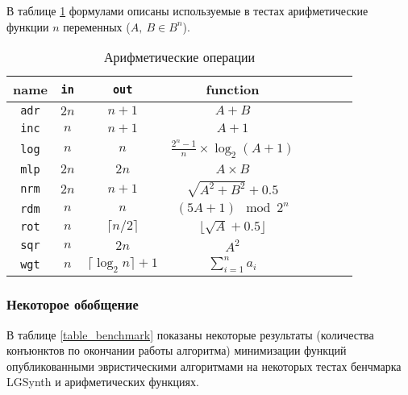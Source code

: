 \documentclass[a4paper,12pt,titlepage,finall]{article}
\begin{document}
В таблице \ref{table_arithmetic} формулами описаны используемые в тестах арифметические функции $ n $ переменных ($ A,\ B \in B^n $).

\begin{table}[h!]
\centering
\begin{tabular}{ |c||c|c||c|c|c|c|c| }
\hline
\textbf{name}   & \texttt{\bf in} & \texttt{\bf out}    & \textbf{function} \\
\hline\hline
\texttt{adr} & $ 2 n $ & $ n + 1 $                      & $ A + B $ \\
\hline
\texttt{inc} & $ n $   & $ n + 1 $                      & $ A + 1 $ \\
\hline
\texttt{log} & $ n $   & $ n $                          & $ \frac{2^n - 1}{n} \times \log_2 (A + 1) $ \\
\hline
\texttt{mlp} & $ 2 n $ & $ 2 n $                        & $ A \times B $ \\
\hline
\texttt{nrm} & $ 2 n $ & $ n + 1 $                      & $ \sqrt{A^2 + B^2} + 0.5 $ \\
\hline
\texttt{rdm} & $ n $   & $ n $                          & $ (5 A + 1) \mod 2^n $ \\
\hline
\texttt{rot} & $ n $   & $ \lceil n / 2 \rceil $        & $ \lfloor \sqrt{A} + 0.5 \rfloor $ \\
\hline
\texttt{sqr} & $ n $   & $ 2 n $                        & $ A^2 $ \\
\hline
\texttt{wgt} & $ n $   & $ \lceil \log_2 n \rceil + 1 $ & $ \sum\limits_{i = 1}^n a_i $ \\
\hline
\end{tabular}
\caption{Арифметические операции}
\label{table_arithmetic}
\end{table}

\subsubsection{Некоторое обобщение}

В таблице \ref{table_benchmark} показаны некоторые результаты (количества конъюнктов по окончании работы алгоритма) минимизации функций опубликованными эвристическими алгоритмами на некоторых тестах бенчмарка LGSynth и арифметических функциях.
\end{document}
